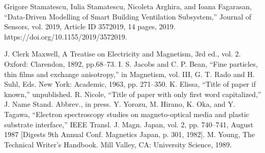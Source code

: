 \documentclass[conference]{IEEEtran}
\begin{document}
\begin{thebibliography}{00}
 Grigore Stamatescu, Iulia Stamatescu, Nicoleta Arghira, and Ioana Fagarasan, “Data-Driven Modelling of Smart Building Ventilation Subsystem,” Journal of Sensors, vol. 2019, Article ID 3572019, 14 pages, 2019. https://doi.org/10.1155/2019/3572019.


 J. Clerk Maxwell, A Treatise on Electricity and Magnetism, 3rd ed., vol. 2. Oxford: Clarendon, 1892, pp.68--73.
 I. S. Jacobs and C. P. Bean, ``Fine particles, thin films and exchange anisotropy,'' in Magnetism, vol. III, G. T. Rado and H. Suhl, Eds. New York: Academic, 1963, pp. 271--350.
 K. Elissa, ``Title of paper if known,'' unpublished.
 R. Nicole, ``Title of paper with only first word capitalized,'' J. Name Stand. Abbrev., in press.
 Y. Yorozu, M. Hirano, K. Oka, and Y. Tagawa, ``Electron spectroscopy studies on magneto-optical media and plastic substrate interface,'' IEEE Transl. J. Magn. Japan, vol. 2, pp. 740--741, August 1987 [Digests 9th Annual Conf. Magnetics Japan, p. 301, 1982].
 M. Young, The Technical Writer's Handbook. Mill Valley, CA: University Science, 1989.
\end{thebibliography}
\vspace{12pt}
\end{document}

